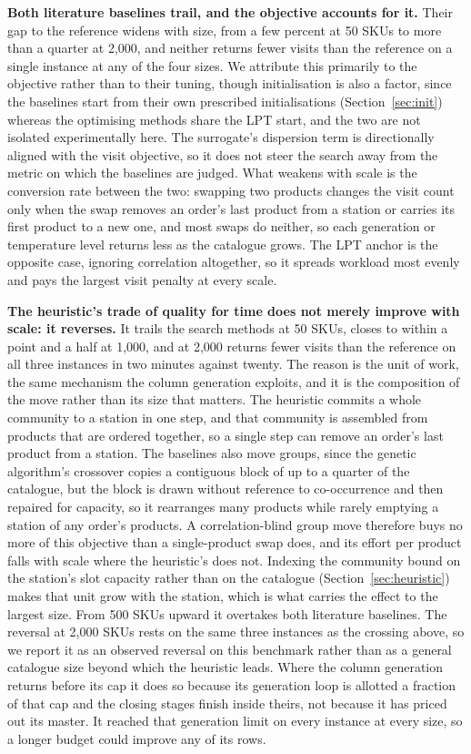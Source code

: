 \documentclass[]{interact}
\begin{document}
\textbf{Both literature baselines trail, and the objective accounts for it.} Their gap to the reference widens with size, from a few percent at 50 SKUs to more than a quarter at 2,000, and neither returns fewer visits than the reference on a single instance at any of the four sizes. We attribute this primarily to the objective rather than to their tuning, though initialisation is also a factor, since the baselines start from their own prescribed initialisations (Section~\ref{sec:init}) whereas the optimising methods share the LPT start, and the two are not isolated experimentally here. The surrogate's dispersion term is directionally aligned with the visit objective, so it does not steer the search away from the metric on which the baselines are judged. What weakens with scale is the conversion rate between the two: swapping two products changes the visit count only when the swap removes an order's last product from a station or carries its first product to a new one, and most swaps do neither, so each generation or temperature level returns less as the catalogue grows. The LPT anchor is the opposite case, ignoring correlation altogether, so it spreads workload most evenly and pays the largest visit penalty at every scale.

\textbf{The heuristic's trade of quality for time does not merely improve with scale: it reverses.} It trails the search methods at 50 SKUs, closes to within a point and a half at 1,000, and at 2,000 returns fewer visits than the reference on all three instances in two minutes against twenty. The reason is the unit of work, the same mechanism the column generation exploits, and it is the composition of the move rather than its size that matters. The heuristic commits a whole community to a station in one step, and that community is assembled from products that are ordered together, so a single step can remove an order's last product from a station. The baselines also move groups, since the genetic algorithm's crossover copies a contiguous block of up to a quarter of the catalogue, but the block is drawn without reference to co-occurrence and then repaired for capacity, so it rearranges many products while rarely emptying a station of any order's products. A correlation-blind group move therefore buys no more of this objective than a single-product swap does, and its effort per product falls with scale where the heuristic's does not. Indexing the community bound on the station's slot capacity rather than on the catalogue (Section~\ref{sec:heuristic}) makes that unit grow with the station, which is what carries the effect to the largest size. From 500 SKUs upward it overtakes both literature baselines. The reversal at 2,000 SKUs rests on the same three instances as the crossing above, so we report it as an observed reversal on this benchmark rather than as a general catalogue size beyond which the heuristic leads. Where the column generation returns before its cap it does so because its generation loop is allotted a fraction of that cap and the closing stages finish inside theirs, not because it has priced out its master. It reached that generation limit on every instance at every size, so a longer budget could improve any of its rows.
\end{document}
